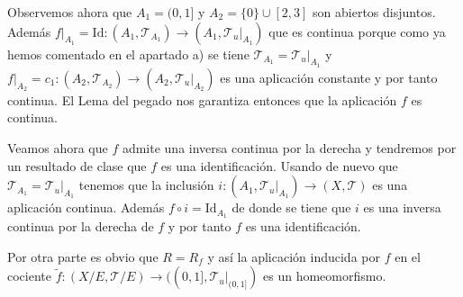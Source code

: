 \documentclass[12pt]{article}
\begin{document}
\begin{ejercicio}
\begin{enumerate}[label=\alph*)]
                Observemos ahora que $A_1=(0,1]$ y $A_2=\{0\}\cup[2,3]$ son abiertos disjuntos. Además $f|_{A_1}=\text{Id}:(A_1,\mathcal{T}_{A_1})\rightarrow(A_1,\mathcal{T}_u|_{A_1})$ que es continua porque como ya hemos comentado en el apartado a) se tiene $\mathcal{T}_{A_1}=\mathcal{T}_u|_{A_1}$ y $f|_{A_2}=c_1:(A_2,\mathcal{T}_{A_2})\rightarrow(A_2,\mathcal{T}_u|_{A_2})$ es una aplicación constante y por tanto continua. El Lema del pegado nos garantiza entonces que la aplicación $f$ es continua.
        
                Veamos ahora que $f$ admite una inversa continua por la derecha y tendremos por un resultado de clase que $f$ es una identificación. Usando de nuevo que $\mathcal{T}_{A_1}=\mathcal{T}_u|_{A_1}$ tenemos que la inclusión $i:(A_1,\mathcal{T}_u|_{A_1})\rightarrow(X,\mathcal{T})$ es una aplicación continua. Además $f\circ i=\text{Id}_{A_1}$ de donde se tiene que $i$ es una inversa continua por la derecha de $f$ y por tanto $f$ es una identificación.
        
                Por otra parte es obvio que $R=R_f$ y así la aplicación inducida por $f$ en el cociente $\tilde{f}:(X/E,\mathcal{T}/E)\rightarrow((0,1],\mathcal{T}_u|_{(0,1]})$ es un homeomorfismo.
            
        \end{enumerate}
    \end{ejercicio}
\end{document}
